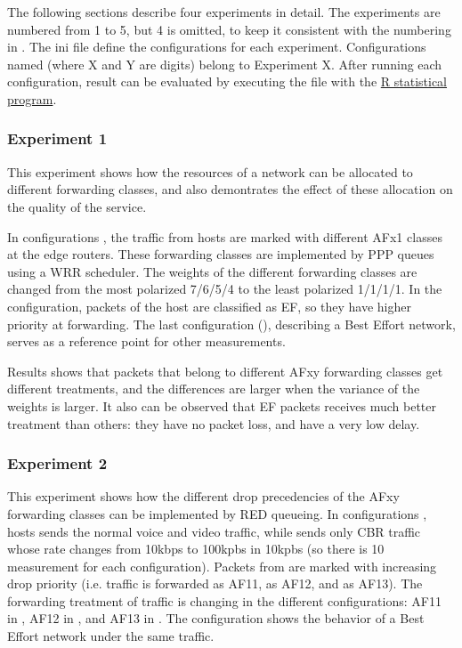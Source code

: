 The following sections describe four experiments in detail. The experiments
are numbered from 1 to 5, but 4 is omitted, to keep it consistent with the
numbering in \cite{Sanjay2010}.
The ini file define the configurations for each experiment. Configurations
named  (where X and Y are digits) belong to Experiment X.
After running each configuration, result can be evaluated by executing
the  file with the
\href{http://www.r-project.org}{R statistical program}.

\subsubsection*{Experiment 1}

This experiment shows how the resources of a network can be allocated
to different forwarding classes, and also demontrates the effect of
these allocation on the quality of the service.

In configurations , the traffic from hosts 
are marked with different AFx1 classes at the edge routers. These
forwarding classes are implemented by PPP queues using a WRR scheduler.
The weights of the different forwarding classes are changed from the most
polarized 7/6/5/4 to the least polarized 1/1/1/1. In the 
configuration, packets of the  host are classified as EF, so
they have higher priority at forwarding. The last configuration
(), describing a Best Effort network, serves as a reference
point for other measurements.

Results shows that packets that belong to different AFxy forwarding classes get
different treatments, and the differences are larger when the variance
of the weights is larger. It also can be observed that EF packets
receives much better treatment than others: they have no packet loss,
and have a very low delay.

\subsubsection*{Experiment 2}

This experiment shows how the different drop precedencies of the AFxy
forwarding classes can be implemented by RED queueing. In configurations
, hosts  sends the normal voice and video
traffic, while  sends only CBR traffic whose rate changes
from 10kbps to 100kpbs in 10kpbs (so there is 10 measurement for each
configuration). Packets from  are marked with
increasing drop priority (i.e.  traffic is forwarded as AF11,
 as AF12, and  as AF13). The forwarding treatment
of  traffic is changing in the different
configurations: AF11 in , AF12 in , and
AF13 in . The  configuration shows the behavior
of a Best Effort network under the same traffic.

